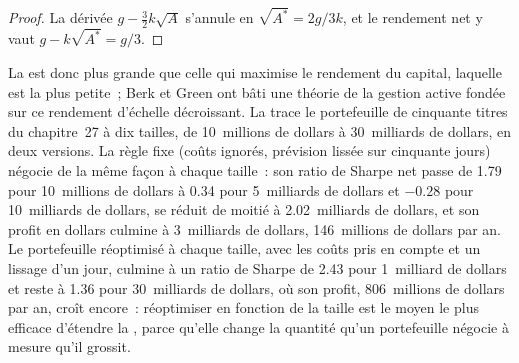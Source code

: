 \begin{proof}
La dérivée $g - \frac32 k\sqrt A$ s'annule en $\sqrt{A^*} = 2g/3k$, et le rendement net y vaut $g - k\sqrt{A^*} = g/3$.
\end{proof}

La  est donc plus grande que celle qui maximise le rendement du capital, laquelle est la plus petite~; Berk et Green ont bâti une théorie de la
gestion active fondée sur ce rendement d'échelle décroissant. La  trace le portefeuille de cinquante titres du chapitre~27 à dix tailles, de
10~millions de dollars à 30~milliards de dollars, en deux versions. La règle fixe (coûts ignorés, prévision lissée sur cinquante jours) négocie de la même façon à chaque taille~: son ratio de Sharpe net
passe de 1.79 pour 10~millions de dollars à 0.34 pour 5~milliards de dollars et $-0.28$ pour 10~milliards de dollars, se réduit de moitié à 2.02~milliards de dollars, et son profit en dollars culmine à
3~milliards de dollars, 146~millions de dollars par an. Le portefeuille réoptimisé à chaque taille, avec les coûts pris en compte et un lissage d'un jour, culmine à un ratio de Sharpe de 2.43 pour 1~milliard de dollars
et reste à 1.36 pour 30~milliards de dollars, où son profit, 806~millions de dollars par an, croît encore~: réoptimiser en fonction de la taille est le moyen le plus efficace d'étendre
la , parce qu'elle change la quantité qu'un portefeuille négocie à mesure qu'il grossit.

